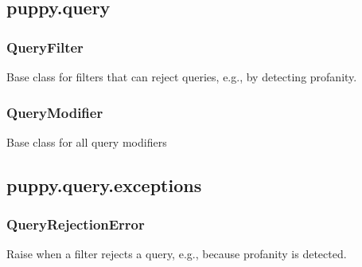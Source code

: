 \documentclass[letterpaper,10pt,english]{sphinxmanual}
\begin{document}
\subsection{puppy.query}
\label{api3.0:module-puppy.query}\label{api3.0:id1}

\subsubsection{QueryFilter}
\label{api3.0:queryfilter}

\begin{fulllineitems}
\label{api3.0:puppy.query.QueryFilter}
Base class for filters that can reject queries, e.g., by detecting
profanity.

\end{fulllineitems}



\subsubsection{QueryModifier}
\label{api3.0:querymodifier}

\begin{fulllineitems}
\label{api3.0:puppy.query.QueryModifier}
Base class for all query modifiers

\end{fulllineitems}



\subsection{puppy.query.exceptions}
\label{api3.0:module-puppy.query.exceptions}\label{api3.0:puppy-query-exceptions}

\subsubsection{QueryRejectionError}
\label{api3.0:queryrejectionerror}

\begin{fulllineitems}
\label{api3.0:puppy.query.exceptions.QueryRejectionError}
Raise when a filter rejects a query, e.g., because profanity is
detected.

\end{fulllineitems}
\end{document}
